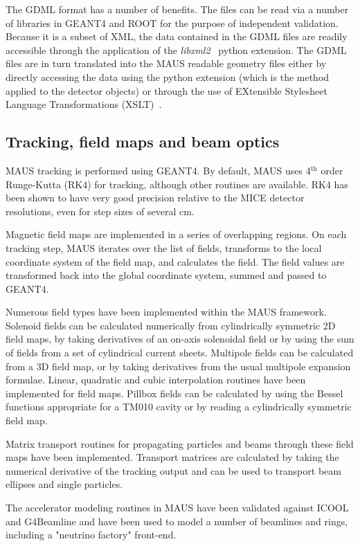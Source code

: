 \documentclass{JINST}
\begin{document}
The GDML format has a number of benefits. The files can be read via a
number of  libraries in GEANT4 and ROOT for the
purpose of independent validation. Because it is a
subset of XML, the data contained in the GDML files are readily
accessible through the application of the \emph{libxml2}~\cite{libxml}  python
extension. The GDML files are in turn translated into the MAUS readable
geometry files either by directly accessing the data using the python
extension (which is the method applied to the detector objects) or
through the use of EXtensible Stylesheet Language Transformations
(XSLT)~\cite{xslt}.

\subsection{Tracking, field maps and beam optics}\label{sec:fieldoptics}
MAUS tracking is performed using GEANT4. By default, MAUS uses 4$^\mathrm{th}$ order Runge-Kutta (RK4) for tracking, although other routines are available. RK4 has been shown to have very good precision relative to the MICE detector resolutions, even for step sizes of several cm.

Magnetic field maps are implemented in a series of overlapping regions. On each tracking step, MAUS iterates over the list of fields, transforms to the local coordinate system of the field map, and calculates the field. The field values are transformed back into the global coordinate system, summed and passed to GEANT4. 

Numerous field types have been implemented within the MAUS framework. Solenoid fields can be calculated numerically from cylindrically symmetric 2D field maps, by taking derivatives of an on-axis solenoidal field or by using the sum of fields from a set of cylindrical current sheets. Multipole fields can be calculated from a 3D field map, or by taking derivatives from the usual multipole expansion formulae. Linear, quadratic and cubic interpolation routines have been implemented for field maps. Pillbox fields can be calculated by using the Bessel functions appropriate for a TM010 cavity or by reading a cylindrically symmetric field map.

Matrix transport routines for propagating particles and beams through these field maps have been implemented. Transport matrices are calculated by taking the numerical derivative of the tracking output and can be used to transport beam ellipses and single particles.

The accelerator modeling routines in MAUS have been validated against ICOOL and G4Beamline and have been used to model a number of beamlines and rings, including a "neutrino factory" front-end.
\end{document}
